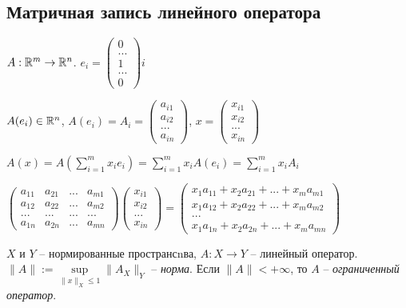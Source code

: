 \subsection{Матричная запись линейного оператора}

\begin{definition}
    $A: \mathbb{R}^m\rightarrow \mathbb{R}^n$. $e_i=\begin{pmatrix} 0 \\ ... \\ 1 \\ ... \\ 0\end{pmatrix}i$

    $A(e_i)\in \mathbb{R}^n$, $A(e_i)=A_i=\begin{pmatrix} a_{i1} \\ a_{i2} \\ ... \\ a_{in}\end{pmatrix}$, $x=\begin{pmatrix} x_{i1} \\ x_{i2} \\ ... \\ x_{in}\end{pmatrix}$

    $A(x)=A(\sum\limits_{i=1}^m x_ie_i)=\sum\limits_{i=1}^m x_iA(e_i)=\sum\limits_{i=1}^m x_iA_i$

    $\begin{pmatrix} a_{11} & a_{21} & ... & a_{m1} 
    \\
    a_{12} & a_{22} & ... & a_{m2} \\
    ... & ... & ... & ... \\
    a_{1n} & a_{2n} & ... & a_{mn} 
    \end{pmatrix}\begin{pmatrix} x_{i1} \\ x_{i2} \\ ... \\ x_{in}\end{pmatrix}=\begin{pmatrix} x_1 a_{11} + x_2 a_{21} + ... + x_ma_{m1} 
    \\
    x_1 a_{12} + x_2 a_{22} + ... + x_m a_{m2} \\
    ... \\
    x_1 a_{1n} + x_2 a_{2n} + ... + x_m a_{mn} 
    \end{pmatrix}$
\end{definition}

\begin{definition}
    $X$ и $Y$ – нормированные пространсnва, $A:X\rightarrow Y$ – линейный оператор. $\|A\|:=\sup\limits_{\|x\|_X\leq 1} \|A_X\|_Y$ – \textit{норма}. Если $\|A\|<+\infty$, то $A$ – \textit{ограниченный оператор}.
\end{definition}

